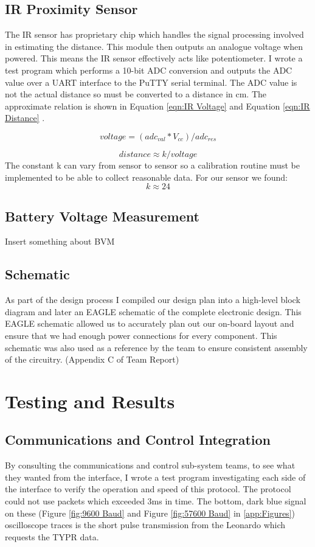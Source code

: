 \documentclass[a4paper,11pt]{article}
\begin{document}
\subsection{IR Proximity Sensor}
The IR sensor has proprietary chip which handles the signal processing involved in estimating the distance. This module then outputs an analogue voltage when powered. This means the IR sensor effectively acts like potentiometer. I wrote a test program which performs a 10-bit ADC conversion and outputs the ADC value over a UART interface to the PuTTY serial terminal. The ADC value is not the actual distance so must be converted to a distance in cm. The approximate relation is shown in Equation \ref{eqn:IR Voltage} and Equation \ref{eqn:IR Distance} .

\begin{equation}
voltage = (adc_{val}*V_{cc})/adc_{res} 
\label{eqn:IR Voltage}
\end{equation}

\begin{equation}
distance \approx k/voltage
\label{eqn:IR Distance}
\end{equation}
The constant k can vary from sensor to sensor so a calibration routine must be implemented to be able to collect reasonable data. For our sensor we found: \[k\approx24\]

\subsection{Battery Voltage Measurement}
Insert something about BVM

\subsection{Schematic}
As part of the design process I compiled our design plan into a high-level block diagram and later an EAGLE schematic of the complete electronic design. This EAGLE schematic allowed us to accurately plan out our on-board layout and ensure that we had enough power connections for every component. This schematic was also used as a reference by the team to ensure consistent assembly of the circuitry. (Appendix C of Team Report)



\section{Testing and Results}
\subsection{Communications and Control Integration}
By consulting the communications and control sub-system teams, to see what they wanted from the interface, I wrote a test program investigating each side of the interface to verify the operation and speed of this protocol. The protocol could not use packets which exceeded 3ms in time. The bottom, dark blue signal on these (Figure \ref{fig:9600 Baud} and Figure \ref{fig:57600 Baud} in \ref{app:Figures}) oscilloscope traces is the short pulse transmission from the Leonardo which requests the TYPR data.  
\end{document}
